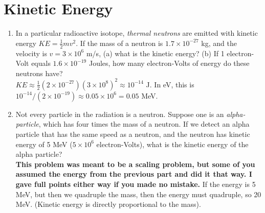 \documentclass[10pt]{article}
\begin{document}
\section{Kinetic Energy}
\begin{enumerate}
\item In a particular radioactive isotope, \textit{thermal neutrons} are emitted with kinetic energy $KE = \frac{1}{2}mv^2$.  If the mass of a neutron is $1.7\times 10^{-27}$ kg, and the velocity is $v = 3\times 10^6$ m/s, (a) what is the kinetic energy? (b) If 1 electron-Volt equals $1.6 \times 10^{-19}$ Joules, how many electron-Volts of energy do these neutrons have? \\ $KE \approx \frac{1}{2}(2 \times 10^{-27}) (3 \times 10^8)^2 \approx 10^{-14}$ J.  In eV, this is $10^{-14}/(2 \times 10^{-19}) \approx 0.05 \times 10^6 = 0.05$ MeV.
\item Not every particle in the radiation is a neutron.  Suppose one is an \textit{alpha-particle}, which has four times the mass of a neutron.  If we detect an alpha particle that has the same speed as a neutron, and the neutron has kinetic energy of 5 MeV ($5 \times 10^{6}$ electron-Volts), what is the kinetic energy of the alpha particle? \\
\textbf{This problem was meant to be a scaling problem, but some of you assumed the energy from the previous part and did it that way.  I gave full points either way if you made no mistake.} If the energy is 5 MeV, but then we quadruple the mass, then the energy must quadruple, so 20 MeV.  (Kinetic energy is directly proportional to the mass).
\end{enumerate}
\end{document}
